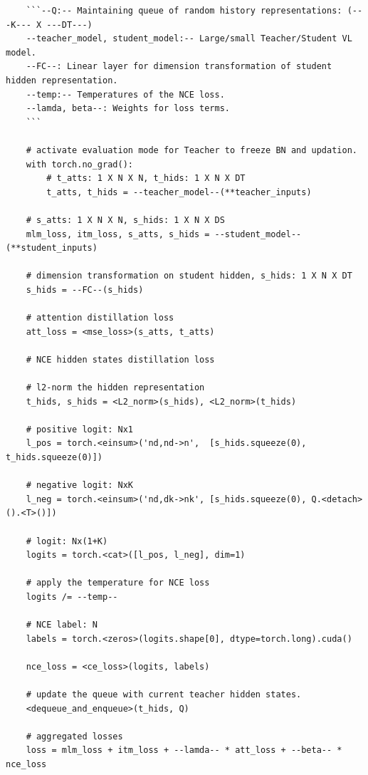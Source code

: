 \label{fig:pseudocode}
{\centering
    \begin{lstlisting}
    ```--Q:-- Maintaining queue of random history representations: (---K--- X ---DT---)
    --teacher_model, student_model:-- Large/small Teacher/Student VL model. 
    --FC--: Linear layer for dimension transformation of student hidden representation.
    --temp:-- Temperatures of the NCE loss.
    --lamda, beta--: Weights for loss terms.
    ```
    
    # activate evaluation mode for Teacher to freeze BN and updation.
    with torch.no_grad():
        # t_atts: 1 X N X N, t_hids: 1 X N X DT
        t_atts, t_hids = --teacher_model--(**teacher_inputs)
    
    # s_atts: 1 X N X N, s_hids: 1 X N X DS
    mlm_loss, itm_loss, s_atts, s_hids = --student_model--(**student_inputs)
    
    # dimension transformation on student hidden, s_hids: 1 X N X DT
    s_hids = --FC--(s_hids)
    
    # attention distillation loss
    att_loss = <mse_loss>(s_atts, t_atts)

    # NCE hidden states distillation loss
    
    # l2-norm the hidden representation
    t_hids, s_hids = <L2_norm>(s_hids), <L2_norm>(t_hids)

    # positive logit: Nx1
    l_pos = torch.<einsum>('nd,nd->n',  [s_hids.squeeze(0), t_hids.squeeze(0)])

    # negative logit: NxK
    l_neg = torch.<einsum>('nd,dk->nk', [s_hids.squeeze(0), Q.<detach>().<T>()])

    # logit: Nx(1+K)
    logits = torch.<cat>([l_pos, l_neg], dim=1)

    # apply the temperature for NCE loss
    logits /= --temp--

    # NCE label: N
    labels = torch.<zeros>(logits.shape[0], dtype=torch.long).cuda()

    nce_loss = <ce_loss>(logits, labels)

    # update the queue with current teacher hidden states.
    <dequeue_and_enqueue>(t_hids, Q)
    
    # aggregated losses
    loss = mlm_loss + itm_loss + --lamda-- * att_loss + --beta-- * nce_loss
    \end{lstlisting}
}
